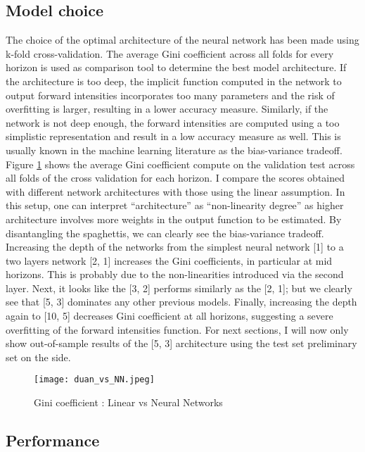 \subsection{Model choice}
\label{sec4-1}


The choice of the optimal architecture of the neural network has been made using k-fold cross-validation. The average Gini coefficient across all folds for every horizon is used as comparison tool to determine the best model architecture. If the architecture is too deep, the implicit function computed in the network to output forward intensities incorporates too many parameters and the risk of overfitting is larger, resulting in a lower accuracy measure. Similarly, if the network is not deep enough, the forward intensities are computed using a too simplistic representation and result in a low accuracy measure as well. This is usually known in the machine learning literature as the bias-variance tradeoff. Figure \ref{fig:ginicomp} shows the average Gini coefficient compute on the validation test across all folds of the cross validation for each horizon. I compare the scores obtained with different network architectures with those using the linear assumption. In this setup, one can interpret ``architecture'' as ``non-linearity degree'' as higher architecture involves more weights in the output function to be estimated. By disantangling the spaghettis, we can clearly see the bias-variance tradeoff. Increasing the depth of the networks from the simplest neural network [1] to a two layers network [2, 1] increases the Gini coefficients, in particular at mid horizons. This is probably due to the non-linearities introduced via the second layer. Next, it looks like the [3, 2] performs similarly as the [2, 1]; but we clearly see that [5, 3] dominates any other previous models. Finally, increasing the depth again to [10, 5] decreases Gini coefficient at all horizons, suggesting a severe overfitting of the forward intensities function. For next sections, I will now only show out-of-sample results of the [5, 3] architecture using the test set preliminary set on the side. \\


\begin{figure}
    \centering
    \texttt{[image: duan\_vs\_NN.jpeg]}
    \caption{Gini coefficient : Linear vs Neural Networks}
    \label{fig:ginicomp}
\end{figure}


\subsection{Performance}
\label{sec4-2}

